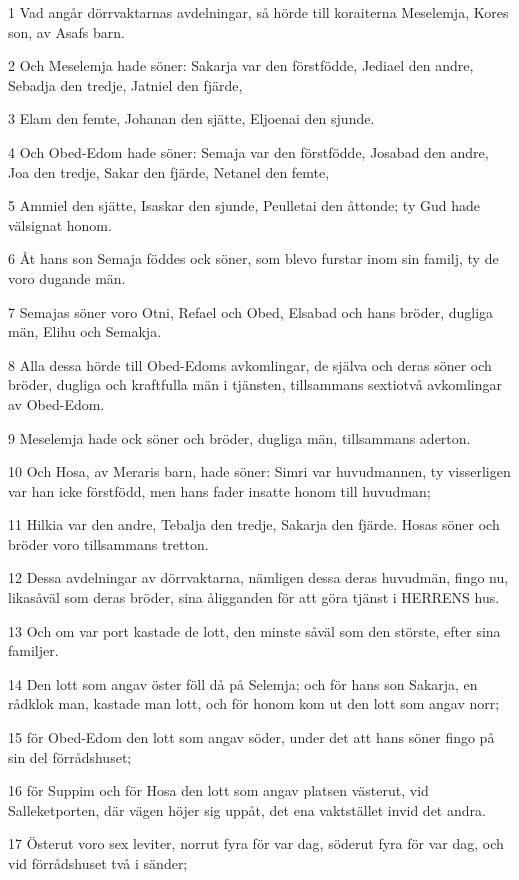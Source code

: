 \par 1 Vad angår dörrvaktarnas avdelningar, så hörde till koraiterna Meselemja, Kores son, av Asafs barn.
\par 2 Och Meselemja hade söner: Sakarja var den förstfödde, Jediael den andre, Sebadja den tredje, Jatniel den fjärde,
\par 3 Elam den femte, Johanan den sjätte, Eljoenai den sjunde.
\par 4 Och Obed-Edom hade söner: Semaja var den förstfödde, Josabad den andre, Joa den tredje, Sakar den fjärde, Netanel den femte,
\par 5 Ammiel den sjätte, Isaskar den sjunde, Peulletai den åttonde; ty Gud hade välsignat honom.
\par 6 Åt hans son Semaja föddes ock söner, som blevo furstar inom sin familj, ty de voro dugande män.
\par 7 Semajas söner voro Otni, Refael och Obed, Elsabad och hans bröder, dugliga män, Elihu och Semakja.
\par 8 Alla dessa hörde till Obed-Edoms avkomlingar, de själva och deras söner och bröder, dugliga och kraftfulla män i tjänsten, tillsammans sextiotvå avkomlingar av Obed-Edom.
\par 9 Meselemja hade ock söner och bröder, dugliga män, tillsammans aderton.
\par 10 Och Hosa, av Meraris barn, hade söner: Simri var huvudmannen, ty visserligen var han icke förstfödd, men hans fader insatte honom till huvudman;
\par 11 Hilkia var den andre, Tebalja den tredje, Sakarja den fjärde. Hosas söner och bröder voro tillsammans tretton.
\par 12 Dessa avdelningar av dörrvaktarna, nämligen dessa deras huvudmän, fingo nu, likasåväl som deras bröder, sina åligganden för att göra tjänst i HERRENS hus.
\par 13 Och om var port kastade de lott, den minste såväl som den störste, efter sina familjer.
\par 14 Den lott som angav öster föll då på Selemja; och för hans son Sakarja, en rådklok man, kastade man lott, och för honom kom ut den lott som angav norr;
\par 15 för Obed-Edom den lott som angav söder, under det att hans söner fingo på sin del förrådshuset;
\par 16 för Suppim och för Hosa den lott som angav platsen västerut, vid Salleketporten, där vägen höjer sig uppåt, det ena vaktstället invid det andra.
\par 17 Österut voro sex leviter, norrut fyra för var dag, söderut fyra för var dag, och vid förrådshuset två i sänder;

